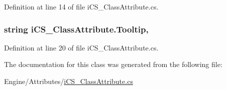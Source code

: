 Definition at line 14 of file i\+C\+S\+\_\+\+Class\+Attribute.\+cs.

\hypertarget{classi_c_s___class_attribute_a27f4c7f1e7b92948c1a50935914105b0}{
\subsubsection[{Tooltip}]{\setlength{\rightskip}{0pt plus 5cm}string i\+C\+S\+\_\+\+Class\+Attribute.\+Tooltip\hspace{0.3cm}{\ttfamily [get]}, {\ttfamily [set]}}}\label{classi_c_s___class_attribute_a27f4c7f1e7b92948c1a50935914105b0}


Definition at line 20 of file i\+C\+S\+\_\+\+Class\+Attribute.\+cs.



The documentation for this class was generated from the following file\+:\begin{DoxyCompactItemize}
\item 
Engine/\+Attributes/\hyperlink{i_c_s___class_attribute_8cs}{i\+C\+S\+\_\+\+Class\+Attribute.\+cs}\end{DoxyCompactItemize}
